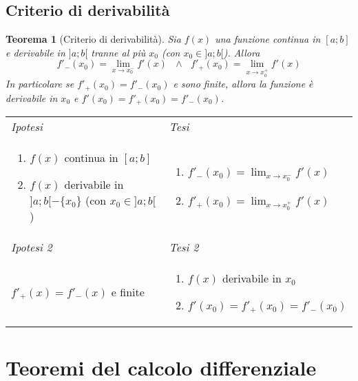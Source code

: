 \documentclass{article}     %
\newtheorem*{theorem}{Teorema}
\newenvironment{shadedTheorem}%
  {\begin{mdframed}[backgroundcolor=lightgray!40, linecolor=white, innertopmargin=4pt, innerbottommargin=13pt]\begin{theorem}}%
  {\end{theorem}\end{mdframed}}
\begin{document}
    \subsection{Criterio di derivabilità}
        \begin{shadedTheorem}[Criterio di derivabilità]
            Sia $f(x)$ una funzione continua in $[a;b]$ e derivabile in $]a;b[$ tranne al più $x_0$ (con $x_0\in ]a;b[$). Allora 
            \[f'_-(x_0)=\lim_{x\to x_0^-}f'(x) ~~~\land~~~ f'_+(x_0)=\lim_{x\to x_0^+}f'(x)\]
            In particolare se $f'_+(x_0) = f'_-(x_0)$ e sono finite, allora la funzione è derivabile in $x_0$ e $f'(x_0)=f'_+(x_0) = f'_-(x_0)$.
        \end{shadedTheorem}
        \begin{tabular}{m{}m{}}
            \textit{Ipotesi} & \textit{Tesi}  \\
            \begin{enumerate}
                \item $f(x)$ continua in $[a;b]$
                \item $f(x)$ derivabile in $]a;b[-\{x_0\}$ (con $x_0\in]a;b[$)
            \end{enumerate} & \begin{enumerate}
                \item $f'_-(x_0)=\lim_{x\to x_0^-}f'(x)$
                \item $f'_+(x_0)=\lim_{x\to x_0^+}f'(x)$
            \end{enumerate}\\
            \textit{Ipotesi 2} & \textit{Tesi 2}  \\
            $f'_+(x) = f'_-(x)$ e finite & \begin{enumerate}
                \item $f(x)$ derivabile in $x_0$
                \item $f'(x_0)=f'_+(x_0) = f'_-(x_0)$
            \end{enumerate}
        \end{tabular}

\section{Teoremi del calcolo differenziale}
\end{document}
